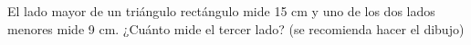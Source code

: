 \documentclass[addpoints,spanish, 12pt,a4paper]{exam}
\begin{document}
\begin{questions}



\question[2] El lado mayor de un triángulo rectángulo mide 15 cm y uno de los dos lados menores mide 9 cm. ¿Cuánto mide el tercer lado? (se recomienda hacer el dibujo)\vspace{100pt}











  



\end{questions}
\end{document}
